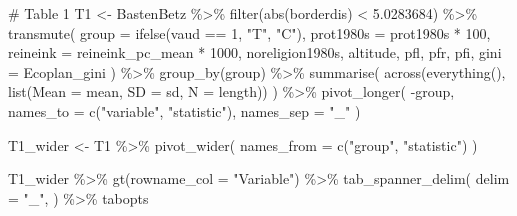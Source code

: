 \documentclass[
  letterpaper,
  DIV=11,
  oneside]{scrreprt}
\newenvironment{Shaded}{\begin{snugshade}}{\end{snugshade}}
\newcommand{\AttributeTok}[1]{\textcolor[rgb]{0.40,0.45,0.13}{#1}}
\newcommand{\CommentTok}[1]{\textcolor[rgb]{0.37,0.37,0.37}{#1}}
\newcommand{\DecValTok}[1]{\textcolor[rgb]{0.68,0.00,0.00}{#1}}
\newcommand{\FloatTok}[1]{\textcolor[rgb]{0.68,0.00,0.00}{#1}}
\newcommand{\FunctionTok}[1]{\textcolor[rgb]{0.28,0.35,0.67}{#1}}
\newcommand{\NormalTok}[1]{\textcolor[rgb]{0.00,0.23,0.31}{#1}}
\newcommand{\OtherTok}[1]{\textcolor[rgb]{0.00,0.23,0.31}{#1}}
\newcommand{\SpecialCharTok}[1]{\textcolor[rgb]{0.37,0.37,0.37}{#1}}
\newcommand{\StringTok}[1]{\textcolor[rgb]{0.13,0.47,0.30}{#1}}
\begin{document}
\begin{Shaded}
\begin{Highlighting}[]
\CommentTok{\# Table 1}
\NormalTok{T1 }\OtherTok{\textless{}{-}}\NormalTok{ BastenBetz }\SpecialCharTok{\%\textgreater{}\%}
    \FunctionTok{filter}\NormalTok{(}\FunctionTok{abs}\NormalTok{(borderdis) }\SpecialCharTok{\textless{}} \FloatTok{5.0283684}\NormalTok{) }\SpecialCharTok{\%\textgreater{}\%}
    \FunctionTok{transmute}\NormalTok{(}
        \AttributeTok{group =} \FunctionTok{ifelse}\NormalTok{(vaud }\SpecialCharTok{==} \DecValTok{1}\NormalTok{, }\StringTok{"T"}\NormalTok{, }\StringTok{"C"}\NormalTok{),}
        \AttributeTok{prot1980s =}\NormalTok{ prot1980s }\SpecialCharTok{*} \DecValTok{100}\NormalTok{,}
        \AttributeTok{reineink =}\NormalTok{ reineink\_pc\_mean }\SpecialCharTok{*} \DecValTok{1000}\NormalTok{,}
\NormalTok{        noreligion1980s,}
\NormalTok{        altitude, }
\NormalTok{        pfl, }
\NormalTok{        pfr, }
\NormalTok{        pfi,}
        \AttributeTok{gini =}\NormalTok{ Ecoplan\_gini}
\NormalTok{    ) }\SpecialCharTok{\%\textgreater{}\%}
    \FunctionTok{group\_by}\NormalTok{(group) }\SpecialCharTok{\%\textgreater{}\%}
    \FunctionTok{summarise}\NormalTok{(}
      \FunctionTok{across}\NormalTok{(}\FunctionTok{everything}\NormalTok{(), }\FunctionTok{list}\NormalTok{(}\AttributeTok{Mean =}\NormalTok{ mean, }\AttributeTok{SD =}\NormalTok{ sd, }\AttributeTok{N =}\NormalTok{ length))}
\NormalTok{      ) }\SpecialCharTok{\%\textgreater{}\%}
    \FunctionTok{pivot\_longer}\NormalTok{(}
      \SpecialCharTok{{-}}\NormalTok{group, }
      \AttributeTok{names\_to =} \FunctionTok{c}\NormalTok{(}\StringTok{"variable"}\NormalTok{, }\StringTok{"statistic"}\NormalTok{), }
      \AttributeTok{names\_sep =} \StringTok{"\_"}
\NormalTok{    )}
\end{Highlighting}
\end{Shaded}

\begin{Shaded}
\begin{Highlighting}[]
\NormalTok{T1\_wider }\OtherTok{\textless{}{-}}\NormalTok{ T1 }\SpecialCharTok{\%\textgreater{}\%} 
    \FunctionTok{pivot\_wider}\NormalTok{(}
        \AttributeTok{names\_from =} \FunctionTok{c}\NormalTok{(}\StringTok{"group"}\NormalTok{, }\StringTok{"statistic"}\NormalTok{)}
\NormalTok{    )}
\end{Highlighting}
\end{Shaded}

\begin{Shaded}
\begin{Highlighting}[]
\NormalTok{T1\_wider }\SpecialCharTok{\%\textgreater{}\%}
  \FunctionTok{gt}\NormalTok{(}\AttributeTok{rowname\_col =} \StringTok{"Variable"}\NormalTok{) }\SpecialCharTok{\%\textgreater{}\%} 
  \FunctionTok{tab\_spanner\_delim}\NormalTok{(}
    \AttributeTok{delim =} \StringTok{"\_"}\NormalTok{,}
\NormalTok{  ) }\SpecialCharTok{\%\textgreater{}\%}
\NormalTok{ tabopts}
\end{Highlighting}
\end{Shaded}
\end{document}
